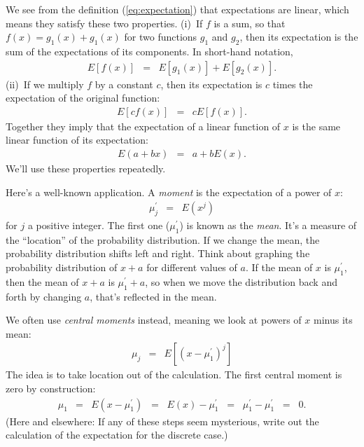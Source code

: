 We see from the definition (\ref{eq:expectation}) that expectations are linear,
which means they satisfy these two properties.
(i)~If $f$ is a sum, so that $f(x) = g_1(x) + g_1(x)$ for two functions $g_1$ and $g_2$,
then its expectation is the sum of the expectations of its components.
In short-hand notation,
\begin{eqnarray*}
    E[f(x)] &=& E[g_1(x)] + E[g_2(x)] .
\end{eqnarray*}
(ii)~If we multiply $f$ by a constant $c$, then its expectation is $c$ times
the expectation of the original function:
\begin{eqnarray*}
    E[cf(x)] &=& c E[f(x)] .
\end{eqnarray*}
Together they imply that the expectation of a linear function of $x$
is the same linear function of its expectation:
\begin{eqnarray*}
    E(a + bx) &=& a + b E(x) .
\end{eqnarray*}
We'll use these properties repeatedly.


Here's a well-known application.
A {\it moment\/} is the expectation of a power of $x$:
\begin{eqnarray*}
    \mu_j^\prime &=& E (x^j)
\end{eqnarray*}
for $j$ a positive integer.
The first one ($\mu_1^\prime$) is known as the {\it mean\/}.
It's a measure of the ``location'' of the probability distribution.
If we change the mean,  the probability distribution shifts left and right.
Think about graphing the probability distribution
of $x+a$ for different values of $a$.
If the mean of $x$ is $\mu^\prime_1$, then the mean of $x+a$ is
$\mu^\prime_1 + a$,
so when we move the distribution back and forth by changing $a$,
that's reflected in the mean.

We often use {\it central moments\/} instead, meaning we look at powers
of $x$ minus its mean:
\begin{eqnarray*}
    \mu_j &=& E [(x-\mu_1^\prime)^j]
\end{eqnarray*}
The idea is to take location out of the calculation.
The first central moment is zero by construction:
\begin{eqnarray*}
    \mu_1 &=& E (x-\mu_1^\prime)
            \;\;=\;\;  E(x) - \mu_1^\prime
            \;\;=\;\;  \mu_1^\prime - \mu_1^\prime  \;\;=\;\; 0.
\end{eqnarray*}
(Here and elsewhere: If any of these steps seem mysterious,
write out the calculation of the expectation for the discrete case.)

